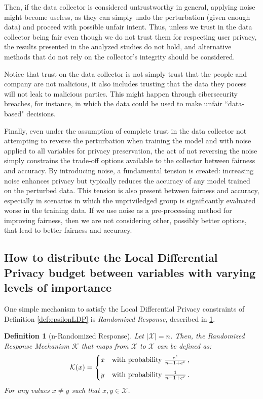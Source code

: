 \documentclass[conference]{IEEEtran}
\newtheorem{definition}{Definition}
\newcommand{\qm}[1]{``#1"}
\begin{document}
Then, if the data collector is considered untrustworthy in general, applying noise might become useless, as they can simply undo the perturbation (given enough data) and proceed with possible unfair intent. Thus, unless we trust in the data collector being fair even though we do not trust them for respecting user privacy, the results presented in the analyzed studies do not hold, and alternative methods that do not rely on the collector's integrity should be considered.

Notice that trust on the data collector is not simply trust that the people and company are not malicious, it also includes trusting that the data they pocess will not leak to malicious parties. This might happen through cibersecurity breaches, for instance, in which the data could be used to make unfair \qm{data-based} decisions.

Finally, even under the assumption of complete trust in the data collector not attempting to reverse the perturbation when training the model and with noise applied to all variables for privacy preservation, the act of not reversing the noise simply constrains the trade-off options available to the collector between fairness and accuracy. By introducing noise, a fundamental tension is created: increasing noise enhances privacy but typically reduces the accuracy of any model trained on the perturbed data\cite{ren2018textsf}. This tension is also present between fairness and accuracy, especially in scenarios in which the unpriviledged group is significantly evaluated worse in the training data\cite{Carlos}. If we use noise as a pre-processing method for improving fairness, then we are not considering other, possibly better options, that lead to better fairness and accuracy\cite{Reductions}\cite{konstantinov2022impossibility}.

\subsection{How to distribute the Local Differential Privacy budget between variables with varying levels of importance}\label{subsec:ldpbudget}

One simple mechanism to satisfy the Local Differential Privacy constraints of Definition \ref{def:epsilonLDP} is \emph{Randomized Response}, described in \ref{def:nrr}.

\begin{definition}[n-Randomized Response]\label{def:nrr} Let $|\mathcal{X}| = n$. Then, the Randomized Response Mechanism $\mathcal{K}$ that maps from $\mathcal{X}$ to $\mathcal{X}$ can be defined as:
	\[
	\mathcal{K}(x) = 
	\begin{dcases*}
		x
		& with probability $\frac{e^\epsilon}{n-1+e^\epsilon}$\,, \\[1ex]
		y 
	   	& with probability $\frac{1}{n-1+e^\epsilon}$\,.
	\end{dcases*}
	\]
For any values $x\neq y$ such that $x,y\in\mathcal{X}$.
\end{definition}
\end{document}
